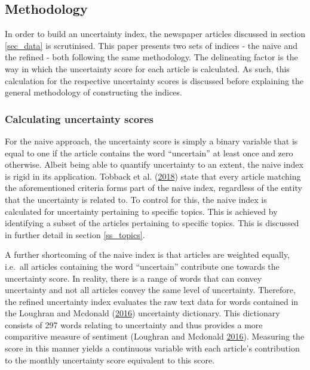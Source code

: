 \documentclass[11pt,preprint, authoryear]{elsarticle}
\numberwithin{equation}{section}
\numberwithin{figure}{section}
\numberwithin{table}{section}
\begin{document}
\subsection{\texorpdfstring{Methodology
\label{sec_method}}{Methodology }}\label{methodology}

In order to build an uncertainty index, the newspaper articles discussed
in section \ref{sec_data} is scrutinised. This paper presents two sets
of indices - the naive and the refined - both following the same
methodology. The delineating factor is the way in which the uncertainty
score for each article is calculated. As such, this calculation for the
respective uncertainty scores is discussed before explaining the general
methodology of constructing the indices.

\subsubsection{\texorpdfstring{Calculating uncertainty scores
\label{ss_uncertaintyscore}}{Calculating uncertainty scores }}\label{calculating-uncertainty-scores}

For the naive approach, the uncertainty score is simply a binary
variable that is equal to one if the article contains the word
``uncertain'' at least once and zero otherwise. Albeit being able to
quantify uncertainty to an extent, the naive index is rigid in its
application. Tobback et al. (\protect\hyperlink{ref-Tobback2018}{2018})
state that every article matching the aforementioned criteria forms part
of the naive index, regardless of the entity that the uncertainty is
related to. To control for this, the naive index is calculated for
uncertainty pertaining to specific topics. This is achieved by
identifying a subset of the articles pertaining to specific topics. This
is discussed in further detail in section \ref{ss_topics}.

A further shortcoming of the naive index is that articles are weighted
equally, i.e.~all articles containing the word ``uncertain'' contribute
one towards the uncertainty score. In reality, there is a range of words
that can convey uncertainty and not all articles convey the same level
of uncertainty. Therefore, the refined uncertainty index evaluates the
raw text data for words contained in the Loughran and Mcdonald
(\protect\hyperlink{ref-Loughran2016}{2016}) uncertainty dictionary.
This dictionary consists of 297 words relating to uncertainty and thus
provides a more comparitive measure of sentiment (Loughran and Mcdonald
\protect\hyperlink{ref-Loughran2016}{2016}). Measuring the score in this
manner yields a continuous variable with each article's contribution to
the monthly uncertainty score equivalent to this score.
\end{document}
